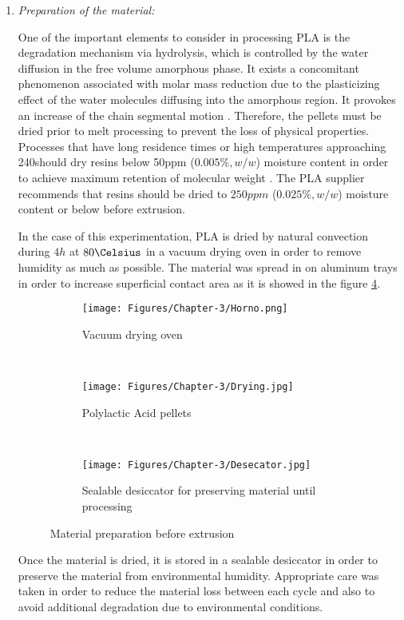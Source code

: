\begin{enumerate}[leftmargin=0in,label=\emph{\alph*}.]
\newpage	
	\item \textit{Preparation of the material:}

	
One of the important elements to consider in processing PLA is the degradation mechanism via hydrolysis, which is  controlled by the water diffusion in the free volume amorphous phase.
It exists a concomitant phenomenon associated with molar mass reduction due to the plasticizing effect of the water molecules diffusing into the amorphous region. 
It provokes an increase of the chain segmental motion \parencite{Fambri2010}.
Therefore, the pellets must be dried prior to melt processing to prevent the loss of physical properties. 
Processes that have long residence  times or high temperatures approaching 240\Celsius should dry resins below 50ppm ($0.005\%, w/w$) moisture content in order to achieve maximum retention of molecular weight \parencite{Lim2010}.
The PLA supplier recommends that resins should be dried to $250ppm$ ($0.025\%, w/w$) moisture content or below before extrusion.
	
In the case of this experimentation, PLA is dried by natural convection during $4h$ at $80\Celsius$ in a vacuum drying oven in order to remove humidity as much as possible. 
The material was spread in on aluminum trays in order to increase superficial contact area as it is showed in the figure \ref{secado}.
	
	\begin{figure}[H]
		\centering
		\begin{subfigure}[t]{0.28\textwidth}
		    \centering
			\texttt{[image: Figures/Chapter-3/Horno.png]}
			\caption{Vacuum drying oven}
			\label{secado.horno}
		\end{subfigure}
		~
		\begin{subfigure}[t]{0.25\textwidth}
			\centering
			\texttt{[image: Figures/Chapter-3/Drying.jpg]}
			\caption{Polylactic Acid pellets}
			\label{secado.pellets}
		\end{subfigure}
		~
		\begin{subfigure}[t]{0.3\textwidth}
			\centering
			\texttt{[image: Figures/Chapter-3/Desecator.jpg]}
			\caption{Sealable desiccator for preserving material until processing}
			\label{secado.guardado}
		\end{subfigure}
		\caption{Material preparation before extrusion}
		\label{secado}
	\end{figure}
	
Once the material is dried, it is stored in a sealable desiccator in order to preserve the material from environmental humidity.
Appropriate care was taken in order to reduce the material loss between each cycle and also to avoid additional degradation due to environmental conditions.
	
\end{enumerate}
